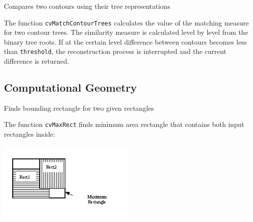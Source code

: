 Compares two contours using their tree representations


\begin{description}
\end{description}

The function \texttt{cvMatchContourTrees} calculates the value of the matching measure for two contour trees. The similarity measure is calculated level by level from the binary tree roots. If at the certain level difference between contours becomes less than \texttt{threshold}, the reconstruction process is interrupted and the current difference is returned.

\subsection{Computational Geometry}

\label{MaxRect}

Finds bounding rectangle for two given rectangles


\begin{description}
\end{description}

The function \texttt{cvMaxRect} finds minimum area rectangle that contains both input rectangles inside:

\includegraphics[width=0.5\textwidth]{pics/maxrect.png}


